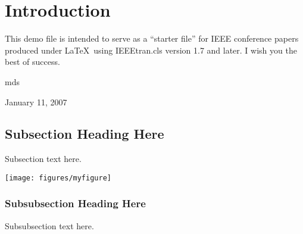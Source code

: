 \section{Introduction}
This demo file is intended to serve as a ``starter file''
for IEEE conference papers produced under \LaTeX\ using
IEEEtran.cls version 1.7 and later.
I wish you the best of success.

\hfill mds
 
\hfill January 11, 2007

\subsection{Subsection Heading Here}
Subsection text here.

\texttt{[image: figures/myfigure]}

\subsubsection{Subsubsection Heading Here}
Subsubsection text here.

